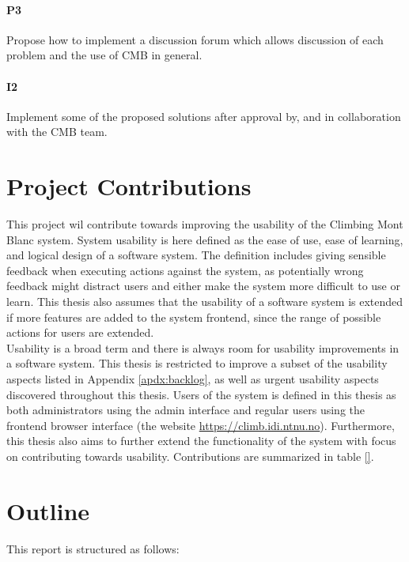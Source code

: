 \paragraph*{P3} Propose how to implement a discussion forum which allows discussion of each problem and the use of CMB in general.

\paragraph*{I2} Implement some of the proposed solutions after approval by, and in collaboration with the CMB team. \\

\section{Project Contributions}
\label{sec:cont}
This project wil contribute towards improving the usability of the Climbing Mont Blanc system. System usability is here defined as the ease of use, ease of learning, and logical design of a software system. The definition includes giving sensible feedback when executing actions against the system, as potentially wrong feedback might distract users and either make the system more difficult to use or learn. This thesis also assumes that the usability of a software system is extended if more features are added to the system frontend, since the range of possible actions for users are extended. \\

Usability is a broad term and there is always room for usability improvements in a software system. This thesis is restricted to improve a subset of the usability aspects listed in Appendix \ref{apdx:backlog}, as well as urgent usability aspects discovered throughout this thesis. Users of the system is defined in this thesis as both administrators using the admin interface and regular users using the frontend browser interface (the website \url{https://climb.idi.ntnu.no}). Furthermore, this thesis also aims to further extend the functionality of the system with focus on contributing towards usability. Contributions are summarized in table \ref{}.



\section{Outline}
\label{sec:out}
This report is structured as follows:\\

